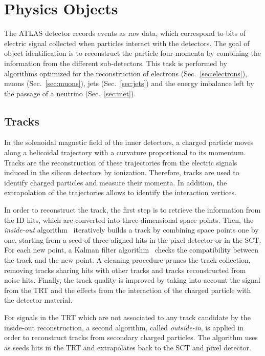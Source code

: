 \chapter{Physics Objects}
\label{sec:objects}

The ATLAS detector records events as raw data, 
which correspond to bits of electric signal collected 
when particles interact with the detectors. 
The goal of object identification is to reconstruct the particle four-momenta
by combining the information from the different sub-detectors.
This task is performed by algorithms optimized for the reconstruction of
electrons (Sec.~\ref{sec:electrons}), muons (Sec.~\ref{sec:muons}), 
jets (Sec.~\ref{sec:jets}) and the energy imbalance left
by the passage of a neutrino (Sec.~\ref{sec:met}).

\section{Tracks}
\label{sec:tracks}

In the solenoidal magnetic field of the inner detectors,
a charged particle moves along a helicoidal trajectory with a 
curvature proportional to its momentum.
Tracks are the reconstruction of these trajectories from the electric 
signals induced in the silicon detectors by ionization.
Therefore, tracks are used to identify charged particles and measure
their momenta. In addition, the extrapolation of the trajectories
allows to identify the interaction vertices.
 
In order to reconstruct the track, the first step is to retrieve the
information from the ID hits, which are converted into
three-dimensional space points. Then, the {\it inside-out}
algorithm~\cite{insideoutalgo}  iteratively builds a track by
combining space points one by one, starting from a seed of three
aligned hits in the pixel detector or in the SCT. 
For each new point, a Kalman filter algorithm~\cite{kalmanfilter}
checks the compatibility between the track and the new point. 
A cleaning procedure prunes the track collection, removing 
tracks sharing hits with other tracks and tracks reconstructed from
noise hits. 
Finally, the track quality is improved by taking into account the
signal from the TRT and the effects from the interaction of the
charged particle with the detector material. 

For signals in the TRT which are not associated to any track candidate
by the inside-out reconstruction, a second algorithm,
called {\it outside-in}, is applied in order to
reconstruct tracks from secondary charged particles. 
The algorithm uses as seeds hits in the TRT
and extrapolates back to the SCT and pixel detector.


